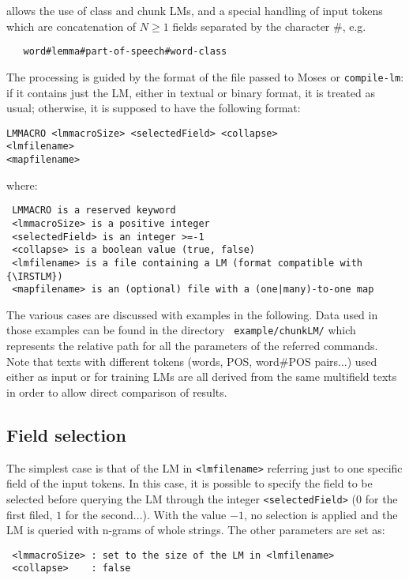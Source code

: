 {\IRSTLM} allows the use of class and chunk LMs, and a special
handling of input tokens which are concatenation of $N \ge 1$ fields separated
by the character \#, e.g.

\begin{verbatim}
   word#lemma#part-of-speech#word-class
\end{verbatim}

\noindent The processing is guided by the format of the file passed to
Moses or {\tt compile-lm}: if it contains just the LM, either in textual or
binary format, it is treated as usual; otherwise, it is supposed to have
the following format:

\begin{verbatim}
LMMACRO <lmmacroSize> <selectedField> <collapse>
<lmfilename>
<mapfilename>
\end{verbatim}

\noindent where:
\begin{verbatim}
 LMMACRO is a reserved keyword
 <lmmacroSize> is a positive integer
 <selectedField> is an integer >=-1
 <collapse> is a boolean value (true, false)
 <lmfilename> is a file containing a LM (format compatible with {\IRSTLM})
 <mapfilename> is an (optional) file with a (one|many)-to-one map
\end{verbatim}

\noindent The various cases are discussed with examples in the
following. Data used in those examples can be found in the directory {\tt
example/chunkLM/} which represents the relative path for all the parameters
of the referred commands.  Note that texts with different tokens (words,
POS, word\#POS pairs...) used either as input or for training LMs are all
derived from the same multifield texts in order to allow direct comparison
of results.

\subsection{Field selection}

The simplest case is that of the LM in {\tt <lmfilename>} referring just to
one specific field of the input tokens. In this case, it is possible to
specify the field to be selected before querying the LM through the integer
{\tt <selectedField>} ($0$ for the first filed, $1$ for the
second...). With the value $-1$, no selection is applied and the LM is
queried with n-grams of whole strings.  The other parameters are set as:

\begin{verbatim}
 <lmmacroSize> : set to the size of the LM in <lmfilename>
 <collapse>    : false
\end{verbatim}

